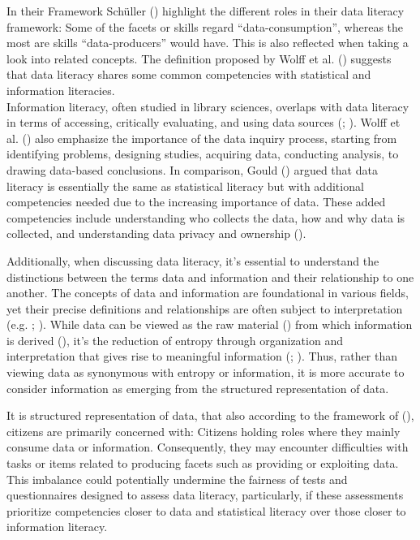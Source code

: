 \documentclass[
  12pt,
  a4paper,
  twoside]{article}
\begin{document}
In their Framework Schüller () highlight the different roles in their data literacy framework: Some of the facets or skills regard ``data-consumption'', whereas the most are skills ``data-producers'' would have. This is also reflected when taking a look into related concepts. The definition proposed by Wolff et al. () suggests that data literacy shares some common competencies with statistical and information literacies.\\
Information literacy, often studied in library sciences, overlaps with data literacy in terms of accessing, critically evaluating, and using data sources (; ). Wolff et al. () also emphasize the importance of the data inquiry process, starting from identifying problems, designing studies, acquiring data, conducting analysis, to drawing data-based conclusions. In comparison, Gould () argued that data literacy is essentially the same as statistical literacy but with additional competencies needed due to the increasing importance of data. These added competencies include understanding who collects the data, how and why data is collected, and understanding data privacy and ownership ().

Additionally, when discussing data literacy, it's essential to understand the distinctions between the terms data and information and their relationship to one another. The concepts of data and information are foundational in various fields, yet their precise definitions and relationships are often subject to interpretation (e.g. ; ). While data can be viewed as the raw material () from which information is derived (), it's the reduction of entropy through organization and interpretation that gives rise to meaningful information (; ). Thus, rather than viewing data as synonymous with entropy or information, it is more accurate to consider information as emerging from the structured representation of data.

It is structured representation of data, that also according to the framework of (), citizens are primarily concerned with: Citizens holding roles where they mainly consume data or information. Consequently, they may encounter difficulties with tasks or items related to producing facets such as providing or exploiting data. This imbalance could potentially undermine the fairness of tests and questionnaires designed to assess data literacy, particularly, if these assessments prioritize competencies closer to data and statistical literacy over those closer to information literacy.
\end{document}
